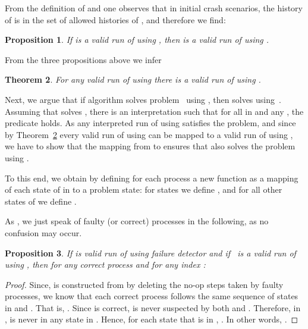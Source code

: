 \documentclass[11pt]{article}
\newtheorem{proposition}{Proposition}[section]
\newtheorem{theorem}[proposition]{Theorem}
\begin{document}
From the definition of  and  one observes that in initial
     crash scenarios, the history of  is in the set of allowed
     histories of , and therefore we find: 

\begin{proposition}\label{prop:R0validPFDrun}
If  is a valid run of 
     using , then  is a valid run of  using .
\end{proposition}

From the three propositions above we infer

\begin{theorem}\label{thm:MPcorr}
For any valid run  of  using  there is a valid
     run  of  using
     .
\end{theorem}


Next, we argue that if algorithm  solves problem~
     using , then  solves  using~.
Assuming that  solves ,  there is an interpretation
      such that for all  in  and any ,  the predicate  holds.
As any interpreted run of  using  satisfies the problem,
     and since by Theorem~\ref{thm:MPcorr} every valid run of 
     using  can be mapped to a valid run of   using
     , we have to show that the mapping from 
     to  ensures that  also solves the problem using
     .


To this end, we obtain  by defining for each
     process  a new function  as a mapping of
     each state of  in  to a problem state: for states  we define , and for all other states  of
      we define .

As , we just speak of faulty
     (or correct) processes in the following, as no confusion may
     occur.

\begin{proposition}\label{prop:correctProcessSameVi}
If   is valid run of  using failure detector 
     and if~ is a valid run of
      using , then for any correct process  and for any
     index : 

\end{proposition}

\begin{proof}
Since,  is constructed from  by deleting the
     no-op steps taken by faulty processes, we know that each correct
     process  follows the same sequence of states in
      and .
That is, .
Since  is correct,  is never suspected by both  and
     .
Therefore, in ,  is never in any state in
     .
Hence, for each state  that  is in ,
     .
In other words, .
\end{proof}
\end{document}
